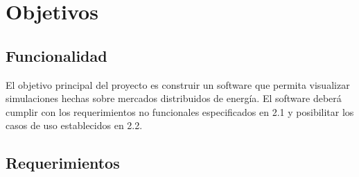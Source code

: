 \documentclass[12pt,a4paper,openright,oneside]{article}
\numberwithin{equation}{section}
\theoremstyle{definition}
\begin{document}













\section{Objetivos}

\subsection{Funcionalidad}
El objetivo principal del proyecto es construir un software que permita visualizar simulaciones hechas sobre mercados distribuidos de energía.
El software deberá cumplir con los requerimientos no funcionales especificados en 2.1 y posibilitar los casos de uso establecidos en 2.2.

\subsection{Requerimientos}
\end{document}
